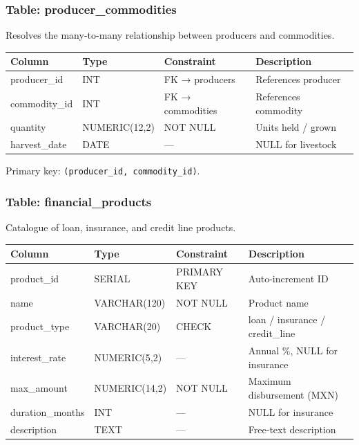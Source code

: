 \documentclass[12pt, a4paper]{article}
\begin{document}
\subsubsection{Table: producer\_commodities}

Resolves the many-to-many relationship between producers and commodities.

\begin{center}
\begin{tabular}{llll}
  \toprule
  \textbf{Column}   & \textbf{Type}    & \textbf{Constraint}   & \textbf{Description} \\
  \midrule
  producer\_id  & INT            & FK → producers   & References producer \\
  commodity\_id & INT            & FK → commodities & References commodity \\
  quantity      & NUMERIC(12,2)  & NOT NULL         & Units held / grown \\
  harvest\_date & DATE           & —                & NULL for livestock \\
  \bottomrule
\end{tabular}
\end{center}

Primary key: \texttt{(producer\_id, commodity\_id)}.

\subsubsection{Table: financial\_products}

Catalogue of loan, insurance, and credit line products.

\begin{center}
\begin{tabular}{llll}
  \toprule
  \textbf{Column}    & \textbf{Type}    & \textbf{Constraint} & \textbf{Description} \\
  \midrule
  product\_id      & SERIAL        & PRIMARY KEY  & Auto-increment ID \\
  name             & VARCHAR(120)  & NOT NULL     & Product name \\
  product\_type    & VARCHAR(20)   & CHECK        & loan / insurance / credit\_line \\
  interest\_rate   & NUMERIC(5,2)  & —            & Annual \%, NULL for insurance \\
  max\_amount      & NUMERIC(14,2) & NOT NULL     & Maximum disbursement (MXN) \\
  duration\_months & INT           & —            & NULL for insurance \\
  description      & TEXT          & —            & Free-text description \\
  \bottomrule
\end{tabular}
\end{center}
\end{document}
